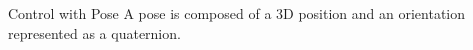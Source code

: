 \section{}
    \begin{frame}[allowframebreaks]{Control with Pose}
        A pose is composed of a 3D position and an orientation represented as a quaternion.
    \end{frame}

    \subsection{}
        
        
        
        

